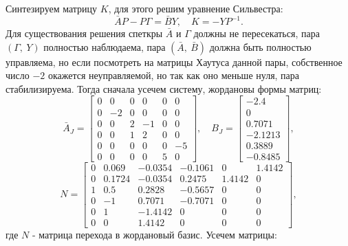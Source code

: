 Синтезируем матрицу $K$, для
этого решим уравнение Сильвестра:
\begin{equation}
    \label{eq:silf1}
    \bar AP-P\Gamma=\bar BY,\quad K=-YP^{-1}.
\end{equation}
Для существования решения спеткры $\bar A$ и $\Gamma$ должны не пересекаться, 
пара $(\Gamma,\ Y)$ полностью наблюдаема,
пара $(\bar A,\ \bar B)$ должна быть полностью управляема,
но если посмотреть на матрицы Хаутуса данной пары, собственное число $-2$
окажется неуправляемой, но так как оно меньше нуля, пара стабилизируема.
Тогда сначала усечем систему, жордановы формы матриц:
\begin{equation*}
     \bar A_J=\begin{bmatrix}
        0 & 0 & 0 & 0 & 0 & 0 \\
        0 & -2 & 0 & 0 & 0 & 0 \\
        0 & 0 & 2 & -1 & 0 & 0 \\
        0 & 0 & 1 & 2 & 0 & 0 \\
        0 & 0 & 0 & 0 & 0 & -5 \\
        0 & 0 & 0 & 0 & 5 & 0
        \end{bmatrix},\quad
        B_J=\begin{bmatrix}
        -2.4 \\
        0 \\
        0.7071 \\
        -2.1213 \\
        0.3889 \\
        -0.8485
        \end{bmatrix},
\end{equation*}
\begin{equation*}
    N=\begin{bmatrix}
        0 & 0.069 & -0.0354 & -0.1061 & 0 & 1.4142 \\
        0 & 0.1724 & -0.0354 & 0.2475 & 1.4142 & 0 \\
        1 & 0.5 & 0.2828 & -0.5657 & 0 & 0 \\
        0 & -1 & 0.7071 & -0.7071 & 0 & 0 \\
        0 & 1 & -1.4142 & 0 & 0 & 0 \\
        0 & 0 & 1.4142 & 0 & 0 & 0
        \end{bmatrix},
\end{equation*}
где $N$ - матрица перехода в жордановый базис. Усечем матрицы:
